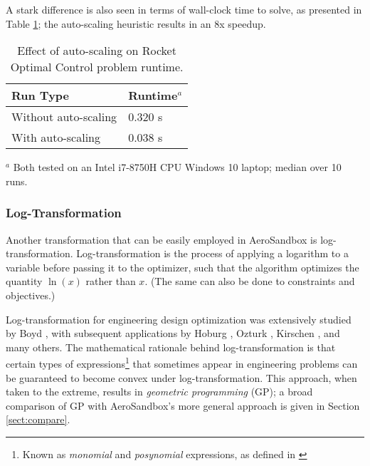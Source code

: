 A stark difference is also seen in terms of wall-clock time to solve, as presented in Table \ref{tab:scaling-compare}; the auto-scaling heuristic results in an 8x speedup.

\begin{table}[H]
    \begin{center}
        \caption{Effect of auto-scaling on Rocket Optimal Control problem runtime.}
        \label{tab:scaling-compare}

        \begin{tabular}[t]{ll}
            \toprule
            Run Type             & Runtime$^a$        \\
            \midrule
            Without auto-scaling & 0.320 \si{\second} \\
            With auto-scaling    & 0.038 \si{\second} \\
            \bottomrule
        \end{tabular}
    \end{center}
    \footnotesize{$^a$ Both tested on an Intel i7-8750H CPU Windows 10 laptop; median over 10 runs.}\\
\end{table}

\subsubsection{Log-Transformation}

Another transformation that can be easily employed in AeroSandbox is log-transformation. Log-transformation is the process of applying a logarithm to a variable before passing it to the optimizer, such that the algorithm optimizes the quantity $\ln(x)$ rather than $x$. (The same can also be done to constraints and objectives.)

Log-transformation for engineering design optimization was extensively studied by Boyd \cite{cvxbook}, with subsequent applications by Hoburg \cite{hoburg}, Ozturk \cite{Ozturk2018}, Kirschen \cite{kirschen}, and many others. The mathematical rationale behind log-transformation is that certain types of expressions\footnote{Known as \textit{monomial} and \textit{posynomial} expressions, as defined in \cite{hoburg}} that sometimes appear in engineering problems can be guaranteed to become convex under log-transformation. This approach, when taken to the extreme, results in \textit{geometric programming} (GP); a broad comparison of GP with AeroSandbox's more general approach is given in Section \ref{sect:compare}.

